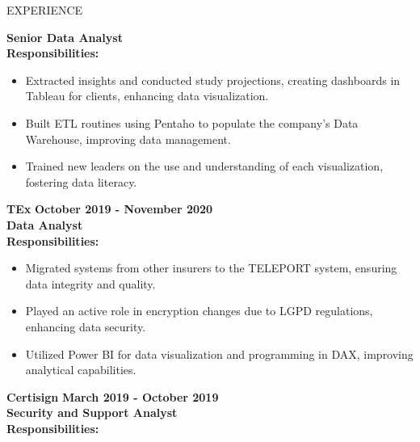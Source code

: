 \documentclass{resume} %
\begin{document}
\begin{rSection}{EXPERIENCE}
\begin{flushleft}
            \textbf{Senior Data Analyst} \\
            \vspace{1em}
            \textbf{Responsibilities:} \\
            \begin{itemize}
                                    \item Extracted insights and conducted study projections, creating dashboards in Tableau for clients, enhancing data visualization.
                                    \item Built ETL routines using Pentaho to populate the company's Data Warehouse, improving data management.
                                    \item Trained new leaders on the use and understanding of each visualization, fostering data literacy.
                            \end{itemize}
            \vspace{0.5em}
            \textbf{TEx} \hfill \textbf{October 2019 {-} November 2020} \\
            \textbf{Data Analyst} \\
            \vspace{1em}
            \textbf{Responsibilities:} \\
            \begin{itemize}
                                    \item Migrated systems from other insurers to the TELEPORT system, ensuring data integrity and quality.
                                    \item Played an active role in encryption changes due to LGPD regulations, enhancing data security.
                                    \item Utilized Power BI for data visualization and programming in DAX, improving analytical capabilities.
                            \end{itemize}
            \vspace{0.5em}
            \textbf{Certisign} \hfill \textbf{March 2019 {-} October 2019} \\
            \textbf{Security and Support Analyst} \\
            \vspace{1em}
            \textbf{Responsibilities:} \\

\end{flushleft}
\end{rSection}
\end{document}
